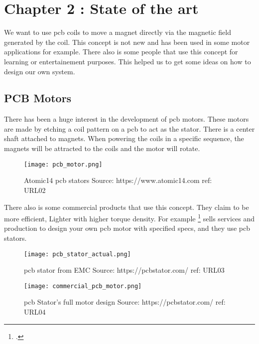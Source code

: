 
\chapter{Chapter 2 : State of the art}

We want to use \gls{pcb} coils to move a magnet directly via the magnetic field generated by the coil. This concept is not new and has been used in some motor applications for example. There also is some people that use this concept for learning or entertainement purposes. This helped us to get some ideas on how to design our own system.

\section{PCB Motors}

There has been a huge interest in the development of \gls{pcb} motors. These motors are made by etching a coil pattern on a \gls{pcb} to act as the stator. There is a center shaft attached to magnets. When powering the coils in a specific sequence, the magnets will be attracted to the coils and the motor will rotate.

\begin{figure}[H]
	\centering
	\texttt{[image: pcb\_motor.png]}
	\caption[\gls{pcb} Motor]{Atomic14 \gls{pcb} stators Source: https://www.atomic14.com ref: URL02}
	\label{fig:pcb_motor}
\end{figure}

There also is some commercial products that use this concept. They claim to be more efficient, Lighter with higher torque density. For example \footcite{noauthor_pcb_nodate} sells services and production to design your own \gls{pcb} motor with specified specs, and they use \gls{pcb} stators.

\begin{figure}[H]
	\centering
	\texttt{[image: pcb\_stator\_actual.png]}
	\caption[Commercial \gls{pcb} Motor's stator by ECM]{\gls{pcb} stator from EMC Source: https://pcbstator.com/ ref: URL03}
	\label{fig:pcb_stator}
\end{figure}

\begin{figure}[H]
	\centering
	\texttt{[image: commercial\_pcb\_motor.png]}
	\caption[Commercial \gls{pcb} Motor by ECM]{\gls{pcb} Stator's full motor design Source: https://pcbstator.com/ ref: URL04}
	\label{fig:pcb_stator_full}
\end{figure}



